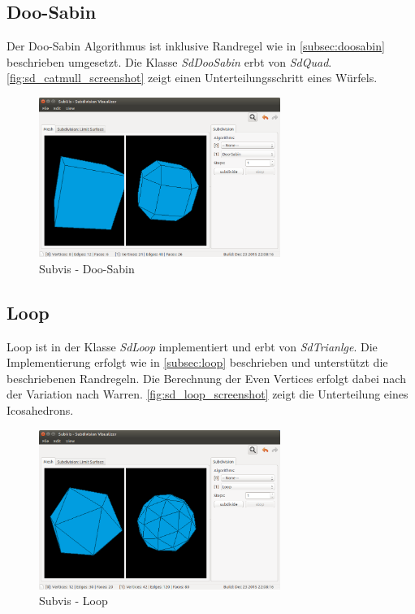 \subsection{Doo-Sabin}

Der Doo-Sabin Algorithmus ist inklusive Randregel wie in \autoref{subsec:doosabin}
beschrieben umgesetzt. Die Klasse \emph{SdDooSabin} erbt von \emph{SdQuad}.
\autoref{fig:sd_catmull_screenshot} zeigt einen Unterteilungsschritt eines Würfels.

\begin{figure}
  \centering
  \includegraphics[width=0.7\textwidth]{content/media/sd_doosabin_screenshot.png}
  \caption{Subvis - Doo-Sabin}
  \label{fig:sd_doosabin_screenshot}
\end{figure}

\subsection{Loop}

Loop ist in der Klasse \emph{SdLoop} implementiert und erbt von \emph{SdTrianlge}.
Die Implementierung erfolgt wie in \autoref{subsec:loop} beschrieben
und unterstützt die beschriebenen Randregeln.
Die Berechnung der Even Vertices erfolgt dabei nach der Variation nach Warren.
\autoref{fig:sd_loop_screenshot} zeigt die Unterteilung eines Icosahedrons.

\begin{figure}
  \centering
  \includegraphics[width=0.7\textwidth]{content/media/sd_loop_screenshot.png}
  \caption{Subvis - Loop}
  \label{fig:sd_loop_screenshot}
\end{figure}

